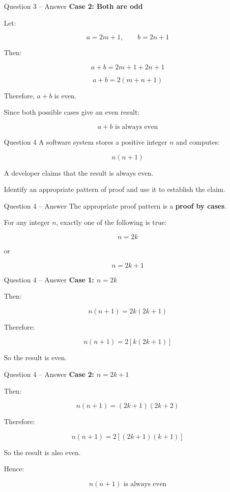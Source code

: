 \begin{frame}{Question 3 -- Answer}
\textbf{Case 2: Both are odd}

Let:

$$
a=2m+1,\qquad b=2n+1
$$

Then:

$$
a+b=2m+1+2n+1
$$

$$
a+b=2(m+n+1)
$$

Therefore, $a+b$ is even.

Since both possible cases give an even result:

$$
\boxed{a+b\text{ is always even}}
$$

\end{frame}


\begin{frame}{Question 4}
A software system stores a positive integer $n$ and computes:

$$
n(n+1)
$$

A developer claims that the result is always even.

Identify an appropriate pattern of proof and use it to establish the claim.
\end{frame}

\begin{frame}{Question 4 -- Answer}
The appropriate proof pattern is a \textbf{proof by cases}.

For any integer $n$, exactly one of the following is true:

$$
n=2k
$$

or

$$
n=2k+1
$$

\end{frame}

\begin{frame}{Question 4 -- Answer}
\textbf{Case 1: $n=2k$}

Then:

$$
n(n+1)=2k(2k+1)
$$

Therefore:

$$
n(n+1)=2[k(2k+1)]
$$

So the result is even.
\end{frame}

\begin{frame}{Question 4 -- Answer}
\textbf{Case 2: $n=2k+1$}

Then:

$$
n(n+1)=(2k+1)(2k+2)
$$

Therefore:

$$
n(n+1)=2[(2k+1)(k+1)]
$$

So the result is also even.

Hence:

$$
\boxed{n(n+1)\text{ is always even}}
$$

\end{frame}


